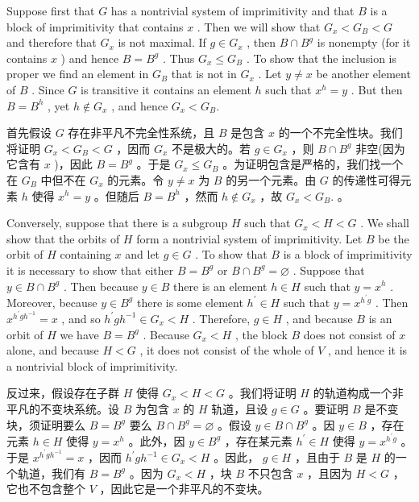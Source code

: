 \documentclass[10pt]{article}
\begin{document}
Suppose first that \(G\) has a nontrivial system of imprimitivity and that \(B\) is a block of imprimitivity that contains \(x\) . Then we will show that \({G}_{x} < {G}_{B} < G\) and therefore that \({G}_{x}\) is not maximal. If \(g \in  {G}_{x}\) , then \(B \cap  {B}^{g}\) is nonempty (for it contains \(x\) ) and hence \(B = {B}^{g}\) . Thus \({G}_{x} \leq  {G}_{B}\) . To show that the inclusion is proper we find an element in \({G}_{B}\) that is not in \({G}_{x}\) . Let \(y \neq  x\) be another element of \(B\) . Since \(G\) is transitive it contains an element \(h\) such that \({x}^{h} = y\) . But then \(B = {B}^{h}\) , yet \(h \notin  {G}_{x}\) , and hence \({G}_{x} < {G}_{B}.\)

\begin{tcolorbox}\relax
首先假设 \(G\) 存在非平凡不完全性系统，且 \(B\) 是包含 \(x\) 的一个不完全性块。我们将证明 \({G}_{x} < {G}_{B} < G\) ，因而 \({G}_{x}\) 不是极大的。若 \(g \in  {G}_{x}\) ，则 \(B \cap  {B}^{g}\) 非空(因为它含有 \(x\) )，因此 \(B = {B}^{g}\) 。于是 \({G}_{x} \leq  {G}_{B}\) 。为证明包含是严格的，我们找一个在 \({G}_{B}\) 中但不在 \({G}_{x}\) 的元素。令 \(y \neq  x\) 为 \(B\) 的另一个元素。由 \(G\) 的传递性可得元素 \(h\) 使得 \({x}^{h} = y\) 。但随后 \(B = {B}^{h}\) ，然而 \(h \notin  {G}_{x}\) ，故 \({G}_{x} < {G}_{B}.\) 。
\end{tcolorbox}

Conversely, suppose that there is a subgroup \(H\) such that \({G}_{x} < H < G\) . We shall show that the orbits of \(H\) form a nontrivial system of imprimitivity. Let \(B\) be the orbit of \(H\) containing \(x\) and let \(g \in  G\) . To show that \(B\) is a block of imprimitivity it is necessary to show that either \(B = {B}^{g}\) or \(B \cap  {B}^{g} = \varnothing\) . Suppose that \(y \in  B \cap  {B}^{g}\) . Then because \(y \in  B\) there is an element \(h \in  H\) such that \(y = {x}^{h}\) . Moreover, because \(y \in  {B}^{g}\) there is some element \({h}^{\prime } \in  H\) such that \(y = {x}^{{h}^{\prime }g}\) . Then \({x}^{{h}^{\prime }g{h}^{-1}} = x\) , and so \({h}^{\prime }g{h}^{-1} \in  {G}_{x} < H\) . Therefore, \(g \in  H\) , and because \(B\) is an orbit of \(H\) we have \(B = {B}^{g}\) . Because \({G}_{x} < H\) , the block \(B\) does not consist of \(x\) alone, and because \(H < G\) , it does not consist of the whole of \(V\) , and hence it is a nontrivial block of imprimitivity.

\begin{tcolorbox}\relax
反过来，假设存在子群 \(H\) 使得 \({G}_{x} < H < G\) 。我们将证明 \(H\) 的轨道构成一个非平凡的不变块系统。设 \(B\) 为包含 \(x\) 的 \(H\) 轨道，且设 \(g \in  G\) 。要证明 \(B\) 是不变块，须证明要么 \(B = {B}^{g}\) 要么 \(B \cap  {B}^{g} = \varnothing\) 。假设 \(y \in  B \cap  {B}^{g}\) 。因 \(y \in  B\) ，存在元素 \(h \in  H\) 使得 \(y = {x}^{h}\) 。此外，因 \(y \in  {B}^{g}\) ，存在某元素 \({h}^{\prime } \in  H\) 使得 \(y = {x}^{{h}^{\prime }g}\) 。于是 \({x}^{{h}^{\prime }g{h}^{-1}} = x\) ，因而 \({h}^{\prime }g{h}^{-1} \in  {G}_{x} < H\) 。因此， \(g \in  H\) ，且由于 \(B\) 是 \(H\) 的一个轨道，我们有 \(B = {B}^{g}\) 。因为 \({G}_{x} < H\) ，块 \(B\) 不只包含 \(x\) ，且因为 \(H < G\) ，它也不包含整个 \(V\) ，因此它是一个非平凡的不变块。
\end{tcolorbox}
\end{document}
